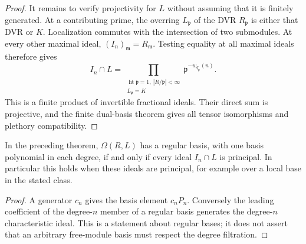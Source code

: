 \begin{proof}
It remains to verify projectivity for $L$ without assuming that it is
finitely generated. At a contributing prime, the overring
$L_{\mathfrak p}$ of the DVR $R_{\mathfrak p}$ is either that DVR
or $K$. Localization commutes with the intersection of two submodules.
At every other maximal ideal, $(I_n)_{\mathfrak m}=R_{\mathfrak m}$.
Testing equality at all maximal ideals therefore gives
\[
 I_n\cap L=
 \prod_{\substack{\operatorname{ht}\mathfrak p=1,\ |R/\mathfrak p|<\infty\\
                              L_{\mathfrak p}=K}}
                \mathfrak p^{-w_{q_{\mathfrak p}}(n)}.
\]
This is a finite product of invertible fractional ideals. Their direct
sum is projective, and the finite dual-basis theorem gives all tensor
isomorphisms and plethory compatibility.
\end{proof}

\begin{corollary}\label{cor:regular-basis-principal-characteristic}
In the preceding theorem, $\Omega(R,L)$ has a regular basis, with
one basis polynomial in each degree, if and only if every ideal
$I_n\cap L$ is principal. In particular this holds when these ideals
are principal, for example over a local base in the stated class.
\end{corollary}
\begin{proof}
A generator $c_n$ gives the basis element $c_nP_n$. Conversely the
leading coefficient of the degree-$n$ member of a regular basis
generates the degree-$n$ characteristic ideal. This is a statement
about regular bases; it does not assert that an arbitrary free-module
basis must respect the degree filtration.
\end{proof}
